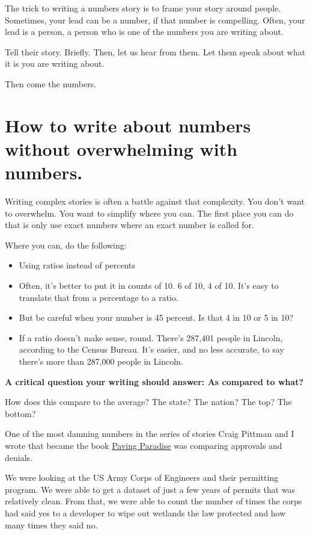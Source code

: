 \documentclass[
  letterpaper,
  DIV=11,
  numbers=noendperiod]{scrreprt}
\providecommand{\tightlist}{%
  \setlength{\itemsep}{0pt}\setlength{\parskip}{0pt}}\usepackage{longtable,booktabs,array}
\begin{document}
The trick to writing a numbers story is to frame your story around
people. Sometimes, your lead can be a number, if that number is
compelling. Often, your lead is a person, a person who is one of the
numbers you are writing about.

Tell their story. Briefly. Then, let us hear from them. Let them speak
about what it is you are writing about.

Then come the numbers.

\hypertarget{how-to-write-about-numbers-without-overwhelming-with-numbers.}{%
\section{How to write about numbers without overwhelming with
numbers.}\label{how-to-write-about-numbers-without-overwhelming-with-numbers.}}

Writing complex stories is often a battle against that complexity. You
don't want to overwhelm. You want to simplify where you can. The first
place you can do that is only use exact numbers where an exact number is
called for.

Where you can, do the following:

\begin{itemize}
\tightlist
\item
  Using ratios instead of percents
\item
  Often, it's better to put it in counts of 10. 6 of 10, 4 of 10. It's
  easy to translate that from a percentage to a ratio.
\item
  But be careful when your number is 45 percent. Is that 4 in 10 or 5 in
  10?
\item
  If a ratio doesn't make sense, round. There's 287,401 people in
  Lincoln, according to the Census Bureau. It's easier, and no less
  accurate, to say there's more than 287,000 people in Lincoln.
\end{itemize}

\textbf{A critical question your writing should answer: As compared to
what?}

How does this compare to the average? The state? The nation? The top?
The bottom?

One of the most damning numbers in the series of stories Craig Pittman
and I wrote that became the book
\href{https://www.amazon.com/Paving-Paradise-Floridas-Vanishing-Wetlands-ebook/dp/B004HZXZCE}{Paving
Paradise} was comparing approvals and denials.

We were looking at the US Army Corps of Engineers and their permitting
program. We were able to get a dataset of just a few years of permits
that was relatively clean. From that, we were able to count the number
of times the corps had said yes to a developer to wipe out wetlands the
law protected and how many times they said no.
\end{document}
